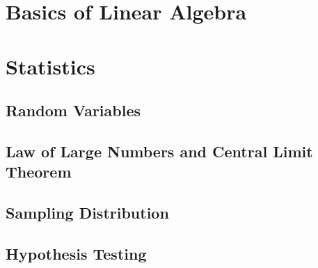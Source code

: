 \ifdefined\printmath

\part{Basics of Linear Algebra}






\part{Statistics}
\chapter{Random Variables}


\chapter{Law of Large Numbers and Central Limit Theorem}


\chapter{Sampling Distribution}


\chapter{Hypothesis Testing}


\fi
